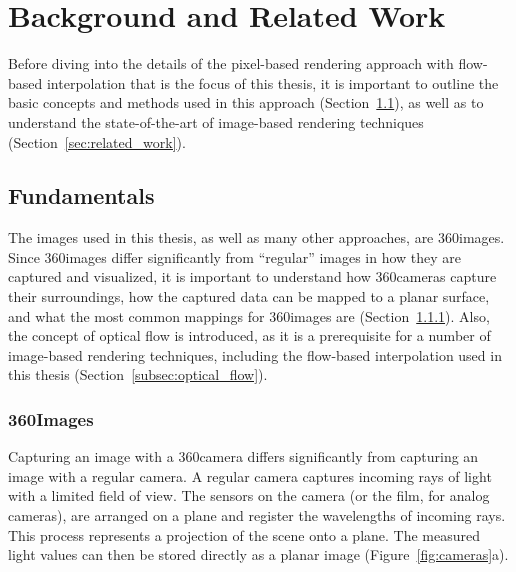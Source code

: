 \chapter{Background and Related Work}
Before diving into the details of the pixel-based rendering approach with flow-based interpolation that is the focus of this thesis, it is important to outline the basic concepts and methods used in this approach (Section~\ref{sec:fundamentals}), as well as to understand the state-of-the-art of image-based rendering techniques (Section~\ref{sec:related_work}).

\section{Fundamentals}\label{sec:fundamentals}
The images used in this thesis, as well as many other approaches, are 360\degree images. Since 360\degree images differ significantly from ``regular'' images in how they are captured and visualized, it is important to understand how 360\degree cameras capture their surroundings, how the captured data can be mapped to a planar surface, and what the most common mappings for 360\degree images are (Section~\ref{subsec:fundamentals_360}). Also, the concept of optical flow is introduced, as it is a prerequisite for a number of image-based rendering techniques, including the flow-based interpolation used in this thesis (Section~\ref{subsec:optical_flow}).

\subsection{360\degree Images}\label{subsec:fundamentals_360}
Capturing an image with a 360\degree camera differs significantly from capturing an image with a regular camera. A regular camera captures incoming rays of light with a limited field of view. The sensors on the camera (or the film, for analog cameras), are arranged on a plane and register the wavelengths of incoming rays. This process represents a projection of the scene onto a plane. The measured light values can then be stored directly as a planar image (Figure~\ref{fig:cameras}a).


